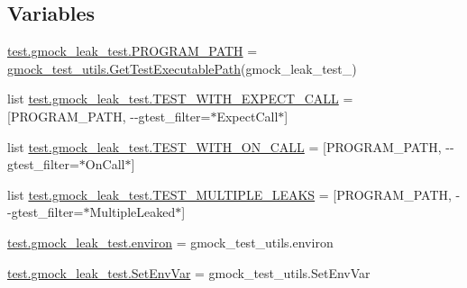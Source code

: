 \subsection*{Variables}
\begin{DoxyCompactItemize}
\item 
\mbox{\hyperlink{namespacetest_1_1gmock__leak__test_a9ed7230f000e029711f6abedc071cedb}{test.\+gmock\+\_\+leak\+\_\+test.\+P\+R\+O\+G\+R\+A\+M\+\_\+\+P\+A\+TH}} = \mbox{\hyperlink{namespacegmock__test__utils_aadd2927024e24f0c53f7ba283402cdb1}{gmock\+\_\+test\+\_\+utils.\+Get\+Test\+Executable\+Path}}(\textquotesingle{}gmock\+\_\+leak\+\_\+test\+\_\+\textquotesingle{})
\item 
list \mbox{\hyperlink{namespacetest_1_1gmock__leak__test_a56df84ecc7d36433c839cf3e37af22af}{test.\+gmock\+\_\+leak\+\_\+test.\+T\+E\+S\+T\+\_\+\+W\+I\+T\+H\+\_\+\+E\+X\+P\+E\+C\+T\+\_\+\+C\+A\+LL}} = \mbox{[}P\+R\+O\+G\+R\+A\+M\+\_\+\+P\+A\+TH, \textquotesingle{}-\/-\/gtest\+\_\+filter=$\ast$Expect\+Call$\ast$\textquotesingle{}\mbox{]}
\item 
list \mbox{\hyperlink{namespacetest_1_1gmock__leak__test_a0e072351d23a6afcf62cde9c1be0e46d}{test.\+gmock\+\_\+leak\+\_\+test.\+T\+E\+S\+T\+\_\+\+W\+I\+T\+H\+\_\+\+O\+N\+\_\+\+C\+A\+LL}} = \mbox{[}P\+R\+O\+G\+R\+A\+M\+\_\+\+P\+A\+TH, \textquotesingle{}-\/-\/gtest\+\_\+filter=$\ast$On\+Call$\ast$\textquotesingle{}\mbox{]}
\item 
list \mbox{\hyperlink{namespacetest_1_1gmock__leak__test_aa23c1c807b2032db496a705b4cd7ff3b}{test.\+gmock\+\_\+leak\+\_\+test.\+T\+E\+S\+T\+\_\+\+M\+U\+L\+T\+I\+P\+L\+E\+\_\+\+L\+E\+A\+KS}} = \mbox{[}P\+R\+O\+G\+R\+A\+M\+\_\+\+P\+A\+TH, \textquotesingle{}-\/-\/gtest\+\_\+filter=$\ast$Multiple\+Leaked$\ast$\textquotesingle{}\mbox{]}
\item 
\mbox{\hyperlink{namespacetest_1_1gmock__leak__test_aa36886cd031cc149c0791986e85fd6de}{test.\+gmock\+\_\+leak\+\_\+test.\+environ}} = gmock\+\_\+test\+\_\+utils.\+environ
\item 
\mbox{\hyperlink{namespacetest_1_1gmock__leak__test_aeb3d543c20213cdbf449bd4ff1a4fb55}{test.\+gmock\+\_\+leak\+\_\+test.\+Set\+Env\+Var}} = gmock\+\_\+test\+\_\+utils.\+Set\+Env\+Var
\end{DoxyCompactItemize}
